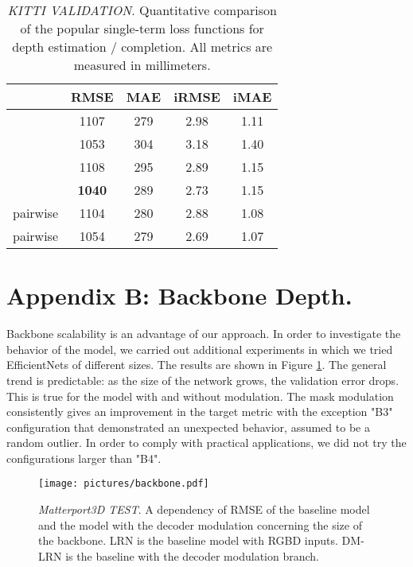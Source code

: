 \documentclass[final]{cvpr}
\begin{document}
    
    \begin{table}[ht]
    \setlength{\tabcolsep}{7pt}
    \renewcommand{\arraystretch}{1.1}
    \centering
    	\begin{tabular}{ c|c|c|c|c}    
& RMSE & MAE & iRMSE & iMAE \\
    		\hline
    		\hline
    		 & 1107 & 279 & 2.98 & 1.11  \\
    		 & 1053 & 304 & 3.18 & 1.40 \\
    		 & 1108 & 295 & 2.89 & 1.15 \\
    		 & \textbf{1040} & 289 & 2.73 & 1.15 \\
    		pairwise & 1104 & 280 & 2.88 & 1.08 \\
    		pairwise & 1054 & 279 & 2.69 & 1.07 \\
    		\hline
    
    	\end{tabular}
    	\vspace{0.1cm}
    	\caption{\emph{KITTI VALIDATION}. Quantitative comparison of the popular single-term loss functions for depth estimation / completion. All metrics are measured in millimeters.}
    	\label{tab:kitti_loss_study}
    \end{table}

\section*{Appendix B: Backbone Depth.}
    
    Backbone scalability is an advantage of our approach. In order to investigate the behavior of the model, we carried out additional experiments in which we tried EfficientNets of different sizes. The results are shown in Figure \ref{fig:backbone_study}. The general trend is predictable: as the size of the network grows, the validation error drops. This is true for the model with and without modulation. The mask modulation consistently gives an improvement in the target metric with the exception "B3" configuration that demonstrated an unexpected behavior, assumed to be a random outlier. In order to comply with practical applications, we did not try the configurations larger than "B4".
    
    \begin{figure}[!h]
        \centering
        \texttt{[image: pictures/backbone.pdf]}
        \caption{\emph{Matterport3D TEST}. A dependency of RMSE of the baseline model and the model with the decoder modulation concerning the size of the backbone. LRN is the baseline model with RGBD inputs. DM-LRN is the baseline with the decoder modulation branch.}
        \label{fig:backbone_study}
    \end{figure}
\end{document}
